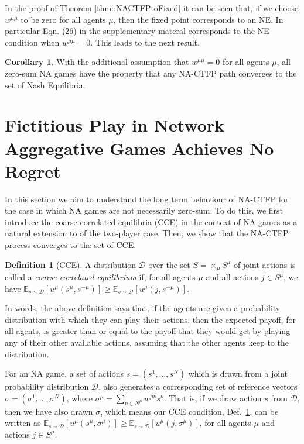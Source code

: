\documentclass{article}
\theoremstyle{definition}
\newtheorem{definition}{Definition}
\newtheorem{corollary}{Corollary}
\newcommand{\wmunu}{w^{\mu \nu}}
\newcommand{\refmu}{\sigma^{\mu}}
\begin{document}
  In the proof of Theorem \ref{thm::NACTFPtoFixed} it can be seen that, if we choose $w^{\mu \mu}$ to be zero for all agents $\mu$, then the fixed point corresponds to an NE. In particular Eqn. (26) in the supplementary materal corresponds to the NE condition when $w^{\mu \mu} = 0$. This leads to the next result.
%
  \begin{corollary} \label{thm::NACTFPtoNE}
    With the additional assumption that $w^{\mu \mu} = 0$ for all agents $\mu$, all zero-sum NA games have the property that any NA-CTFP path converges to the set of Nash Equilibria.
  \end{corollary}

\section{Fictitious Play  in Network Aggregative Games Achieves No Regret}
  \label{sec::CCEConvergence}

  In this section we aim to understand the long term behaviour of
  NA-CTFP for the case in which NA games are not necessarily
  zero-sum. To do this, we first introduce the coarse correlated
  equilibria (CCE) \cite{Nisan2007} in the context of NA games as a
  natural extension to of the two-player case. Then, we show that
  the NA-CTFP process converges to the set of CCE.
  \begin{definition}[CCE] \label{def::CCE}
    A distribution $\mathcal{D}$ over the set $S = \times_\mu S^\mu$
    of joint actions is called a \emph{coarse correlated equilibrium}
    if, for all agents $\mu$ and all actions $j \in S^\mu$, we have
    $\mathbb{E}_{s \sim \mathcal{D}}[u^\mu (s^\mu, s^{- \mu})] \geq
    \mathbb{E}_{s \sim \mathcal{D}}[u^\mu (j, s^{- \mu})]$.
  \end{definition}

  In words, the above definition says that, if the agents are given a
  probability distribution with which they can play their actions, then
  the expected payoff, for all agents, is greater than or equal to the
  payoff that they would get by playing any of their other available
  actions, assuming that the other agents keep to the distribution.
  
  For an NA game, a set of actions $s = (s^1, \ldots, s^N)$ which is
  drawn from a joint probability distribution $\mathcal{D}$, also
  generates a corresponding set of reference vectors $\sigma =
  (\sigma^1, \ldots, \sigma^N)$, where $\sigma^\mu = \sum_{\nu \in
    N^\mu} \wmunu s^\nu$. That is, if we draw action $s$ from
  $\mathcal{D}$, then we have also drawn $\sigma$, which means our CCE
  condition, Def.~\ref{def::CCE}, can be written as $ \mathbb{E}_{s
    \sim \mathcal{D}}[u^\mu (s^\mu, \refmu)] \geq \mathbb{E}_{s \sim
    \mathcal{D}}[u^\mu (j, \refmu)]$, for all agents $\mu$ and actions $j \in S^\mu$.
\end{document}
